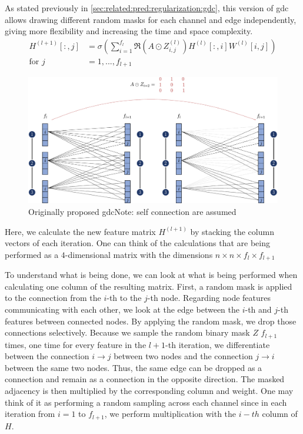 As stated previously in \cref{sec:related:pred:regularization:gdc}, this version of \ac{gdc} allows drawing different random masks for each channel and edge independently, giving more flexibility and increasing the time and space complexity.
\begin{equation}
    \begin{aligned}
        H^{(l+1)}[:,j] & = \sigma \left(\sum_{i=1}^{f_{l}}\mathfrak{R}\left(A \odot Z_{i,j}^{(l)}\right)H^{(l)}[:,i]W^{(l)}[i,j]\right) \\
        \text{for } j  & = 1,..., f_{l+1}
    \end{aligned}\label{eq:implementaion:GDC-eq4}
\end{equation}
\begin{figure}[ht]
    \centering
    \includegraphics[width= 0.90\linewidth]{gfx/implementation/GDC-eq5.pdf}
    \caption{Originally proposed \ac{gdc}Note: self connection are assumed}\label{fig:implementaion:GDC-eq5}
\end{figure}
Here, we calculate the new feature matrix $H^{(l+1)}$ by stacking the column vectors of each iteration. One can think of the calculations that are being performed as a $4$-dimensional matrix with the dimensions $n\times n\times f_{l}\times f_{l+1}$

To understand what is being done, we can look at what is being performed when calculating one column of the resulting matrix. First, a random mask is applied to the connection from the $i$-th to the $j$-th node. Regarding node features communicating with each other, we look at the edge between the $i$-th and $j$-th features between connected nodes. By applying the random mask, we drop those connections selectively. Because we sample the random binary mask $Z$ $f_{l+1}$ times, one time for every feature in the $l+1$-th iteration, we differentiate between the connection $i \rightarrow j$ between two nodes and the connection $j \rightarrow i$ between the same two nodes. Thus, the same edge can be dropped as a connection and remain as a connection in the opposite direction. The masked adjacency is then multiplied by the corresponding column and weight.
One may think of it as performing a random sampling across each channel since in each iteration from $i=1$ to $f_{l+1}$, we perform multiplication with the $i-th$ column of $H$.

